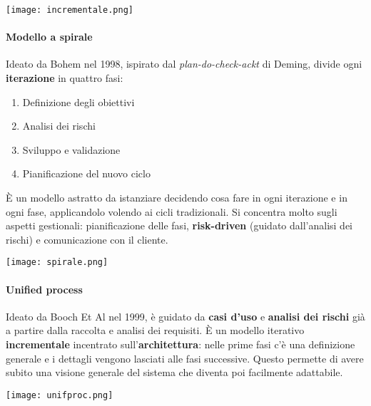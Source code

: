 \begin{center}
	\texttt{[image: incrementale.png]}
\end{center}

\paragraph{Modello a spirale}
Ideato da Bohem nel 1998, ispirato dal \textit{plan-do-check-ackt} di Deming, divide ogni \textbf{iterazione} in quattro fasi:
\begin{enumerate}
	\item Definizione degli obiettivi
	\item Analisi dei rischi
	\item Sviluppo e validazione
	\item Pianificazione del nuovo ciclo
\end{enumerate}
È un modello astratto da istanziare decidendo cosa fare in ogni iterazione e in ogni fase, applicandolo volendo ai cicli tradizionali. Si concentra molto sugli aspetti gestionali: pianificazione delle fasi, \textbf{risk-driven} (guidato dall'analisi dei rischi) e comunicazione con il cliente.

\begin{center}
	\texttt{[image: spirale.png]}
\end{center}

\paragraph{Unified process}
Ideato da Booch Et Al nel 1999, è guidato da \textbf{casi d'uso} e \textbf{analisi dei rischi} già a partire dalla raccolta e analisi dei requisiti. È un modello iterativo \textbf{incrementale} incentrato sull'\textbf{architettura}: nelle prime fasi c'è una definizione generale e i dettagli vengono lasciati alle fasi successive. Questo permette di avere subito una visione generale del sistema che diventa poi facilmente adattabile.
\begin{center}
	\texttt{[image: unifproc.png]}
\end{center}

